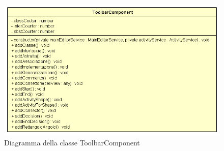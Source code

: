 \begin{figure}[h!]
	\centering
	\includegraphics[scale=0.8]{res/sections/SpecificaFrontEnd/Components/Disegnetti/toolbar.png}
	\caption{Diagramma della classe ToolbarComponent}
\end{figure}

